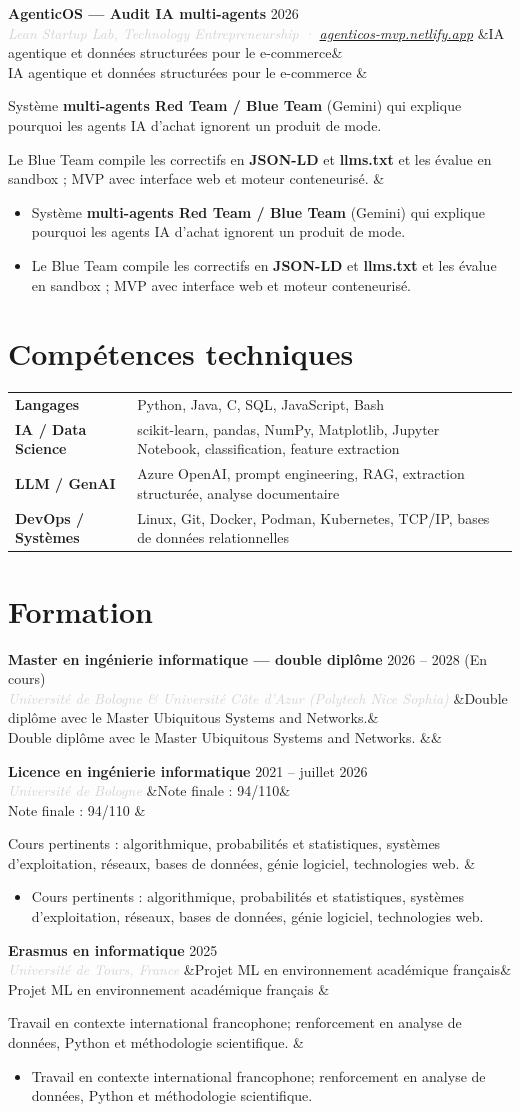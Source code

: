 \documentclass[a4paper,10pt]{article}
\newcommand{\entrylist}[5]{%
  \noindent\textbf{#1} \hfill \textcolor{accent}{#2}\\
  \textit{\textcolor{lightgray}{#3}}%
  \ifx&#4&\else\\[-0.05em]#4\fi
  \vspace{0.15em}
  \ifx&#5&\else\begin{itemize}#5\end{itemize}\fi
  \vspace{0.1em}
}
\newcommand{\skillrow}[2]{\textbf{#1} & #2 \\[0.15em]}
\begin{document}
\entrylist{AgenticOS — Audit IA multi-agents}{2026}{Lean Startup Lab, Technology Entrepreneurship · \href{https://agenticos-mvp.netlify.app}{agenticos-mvp.netlify.app}}{IA agentique et données structurées pour le e-commerce}{
  \item Système \textbf{multi-agents Red Team / Blue Team} (Gemini) qui explique pourquoi les agents IA d'achat ignorent un produit de mode.
  \item Le Blue Team compile les correctifs en \textbf{JSON-LD} et \textbf{llms.txt} et les évalue en sandbox ; MVP avec interface web et moteur conteneurisé.
}

\section{Compétences techniques}
\begin{tabularx}{\textwidth}{@{}>{\raggedright\arraybackslash}p{3.1cm}X@{}}
\skillrow{Langages}{Python, Java, C, SQL, JavaScript, Bash}
\skillrow{IA / Data Science}{scikit-learn, pandas, NumPy, Matplotlib, Jupyter Notebook, classification, feature extraction}
\skillrow{LLM / GenAI}{Azure OpenAI, prompt engineering, RAG, extraction structurée, analyse documentaire}
\skillrow{DevOps / Systèmes}{Linux, Git, Docker, Podman, Kubernetes, TCP/IP, bases de données relationnelles}
\end{tabularx}

\section{Formation}
\entrylist{Master en ingénierie informatique — double diplôme}{2026 -- 2028 (En cours)}{Université de Bologne \& Université Côte d'Azur (Polytech Nice Sophia)}{Double diplôme avec le Master Ubiquitous Systems and Networks.}{}

\entrylist{Licence en ingénierie informatique}{2021 -- juillet 2026}{Université de Bologne}{Note finale : 94/110}{
  \item Cours pertinents : algorithmique, probabilités et statistiques, systèmes d'exploitation, réseaux, bases de données, génie logiciel, technologies web.
}

\entrylist{Erasmus en informatique}{2025}{Université de Tours, France}{Projet ML en environnement académique français}{
  \item Travail en contexte international francophone; renforcement en analyse de données, Python et méthodologie scientifique.
}
\end{document}
